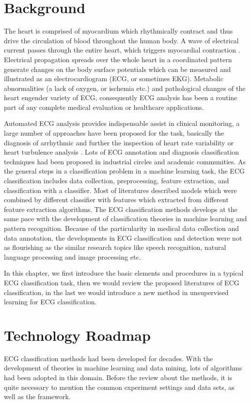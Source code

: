 \documentclass{bmcart}
\begin{document}
\section*{Background}
The heart is comprised of myocardium which rhythmically contract and thus drive the circulation of blood throughout the human body.
A wave of electrical current passes through the entire heart, which triggers myocardial contraction \cite{clifford2006advanced}.
Electrical propagation spreads over the whole heart in a coordinated pattern generate changes on the body surface potentials which can be measured and illustrated as an electrocardiogram (ECG, or sometimes EKG).
Metabolic abnormalities (a lack of oxygen, or ischemia etc.) and pathological changes of the heart engender variety of ECG, consequently ECG analysis has been a routine part of any complete medical evaluation or healthcare applications.

Automated ECG analysis provides indispensable assist in clinical monitoring, a large number of approaches have been proposed for the task, basically the diagnosis of arrhythmic and further the inspection of heart rate variability or heart turbulence analysis \cite{mar2011optimization}. 
Lots of  ECG annotation and diagnosis classification techniques had been proposed in industrial circles and academic communities. 
As the general steps in a classification problem in a machine learning task, the ECG classification includes data collection, preprocessing, feature extraction, and classification with a classifier. 
Most of literatures described models which were combined by different classifier with features which extracted from different feature extraction algorithms.
The ECG classification methods develops at the same pace with the development of classification theories in machine learning and pattern recognition. 
Because of the particularity in medical data collection and data annotation, the developments in ECG classification and detection were not as flourishing as the similar research topics like speech recognition, natural language processing and image processing etc.

In this chapter, we first introduce the basic elements and procedures in a typical ECG classification task, then we would review the proposed literatures of ECG classification, in the last we would introduce a new method in unsupervised learning for ECG classification. 

\section*{Technology Roadmap}
ECG classification methods had been developed for decades. With the development of theories in machine learning and data mining, lots of algorithms had been adopted in this domain. Before the review about the methods, it is quite necessary to mention the common experiment settings and data sets, as well as the framework.
 
\end{document}
